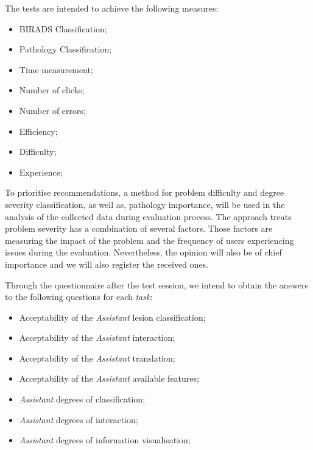 The tests are intended to achieve the following measures:


\hfill

\begin{itemize}
\item BIRADS Classification;
\item Pathology Classification;
\item Time measurement;
\item Number of clicks;
\item Number of errors;
\item Efficiency;
\item Difficulty;
\item Experience;
\end{itemize}

\hfill


To prioritise recommendations, a method for problem difficulty and degree severity classification, as well as, pathology importance, will be used in the analysis of the collected data during evaluation process. The approach treats problem severity has a combination of several factors. Those factors are measuring the impact of the problem and the frequency of users experiencing issues during the evaluation. Nevertheless, the opinion will also be of chief importance and we will also register the received ones.

\hfill


Through the questionnaire after the test session, we intend to obtain the answers to the following questions for each \textit{task}:


\hfill

\begin{itemize}
\item Acceptability of the \textit{Assistant} lesion classification;
\item Acceptability of the \textit{Assistant} interaction;
\item Acceptability of the \textit{Assistant} translation;
\item Acceptability of the \textit{Assistant} available features;
\item \textit{Assistant} degrees of classification;
\item \textit{Assistant} degrees of interaction;
\item \textit{Assistant} degrees of information visualisation;
\end{itemize}

\hfill

